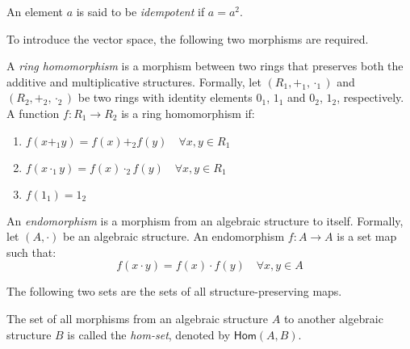 \documentclass[
	11pt, %
	fleqn, %
	a4paper, %
]{LegrandOrangeBook}
\newcommand{\Hom}{\mathsf{Hom}} %
\begin{document}
\begin{definition}
    An element $a$ is said to be \emph{idempotent} if $a = a^2$.
\end{definition}

\newpage

To introduce the vector space, the following two morphisms are required.

\begin{definition}
    A \emph{ring homomorphism} is a morphism between two rings that preserves both the additive and multiplicative structures. Formally, let $(R_1, +_1, \cdot_1)$ and $(R_2, +_2, \cdot_2)$ be two rings with identity elements $0_1$, $1_1$ and $0_2$, $1_2$, respectively. A function $f: R_1 \to R_2$ is a ring homomorphism if:
    \begin{enumerate}
        \item $f(x +_1 y) = f(x) +_2 f(y) \quad \forall x, y \in R_1$
        \item $f(x \cdot_1 y) = f(x) \cdot_2 f(y) \quad \forall x, y \in R_1$
        \item $f(1_1) = 1_2$
    \end{enumerate}    
\end{definition}

\begin{definition}[Endomorphism]
    An \emph{endomorphism} is a morphism from an algebraic structure to itself. Formally, let $(A, \cdot)$ be an algebraic structure. An endomorphism $f: A \to A$ is a set map such that:
    \[
        f(x \cdot y) = f(x) \cdot f(y) \quad \forall x, y \in A
    \]
\end{definition}

The following two sets are the sets of all structure-preserving maps.

\begin{definition}
    The set of all morphisms from an algebraic structure $A$ to another algebraic structure $B$ is called the \emph{hom-set}, denoted by $\Hom(A, B)$. 
\end{definition}
\end{document}
